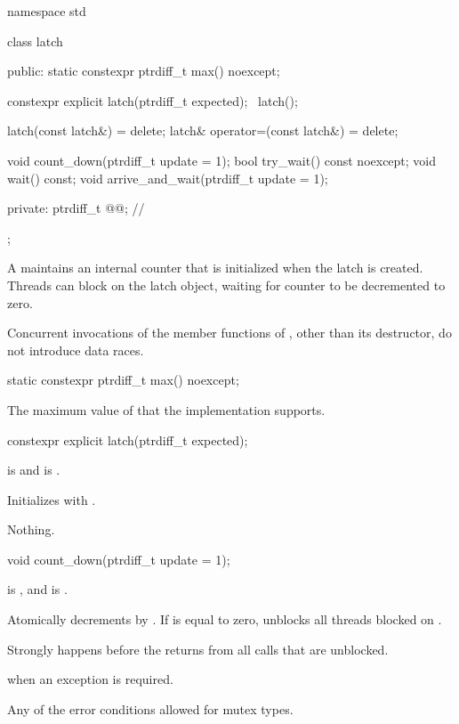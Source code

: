\begin{codeblock}
namespace std {
  class latch {
  public:
    static constexpr ptrdiff_t max() noexcept;

    constexpr explicit latch(ptrdiff_t expected);
    ~latch();

    latch(const latch&) = delete;
    latch& operator=(const latch&) = delete;

    void count_down(ptrdiff_t update = 1);
    bool try_wait() const noexcept;
    void wait() const;
    void arrive_and_wait(ptrdiff_t update = 1);

  private:
    ptrdiff_t @@;  // \expos
  };
}
\end{codeblock}

\pnum
A  maintains an internal counter
that is initialized when the latch is created.
Threads can block on the latch object,
waiting for counter to be decremented to zero.

\pnum
Concurrent invocations of the member functions of ,
other than its destructor, do not introduce data races.

%
\begin{itemdecl}
static constexpr ptrdiff_t max() noexcept;
\end{itemdecl}

\begin{itemdescr}
\pnum
\returns
The maximum value of  that the implementation supports.
\end{itemdescr}

%
\begin{itemdecl}
constexpr explicit latch(ptrdiff_t expected);
\end{itemdecl}

\begin{itemdescr}
\pnum
\expects
{} is  and
 is .

\pnum
\effects
Initializes  with .

\pnum
\throws
Nothing.
\end{itemdescr}

%
\begin{itemdecl}
void count_down(ptrdiff_t update = 1);
\end{itemdecl}

\begin{itemdescr}
\pnum
\expects
{} is , and
 is .

\pnum
\effects
Atomically decrements  by .
If  is equal to zero,
unblocks all threads blocked on .

\pnum
\sync
Strongly happens before the returns from all calls that are unblocked.

\pnum
\throws
{} when an exception is required.

\pnum
\errors
Any of the error conditions
allowed for mutex types.
\end{itemdescr}


